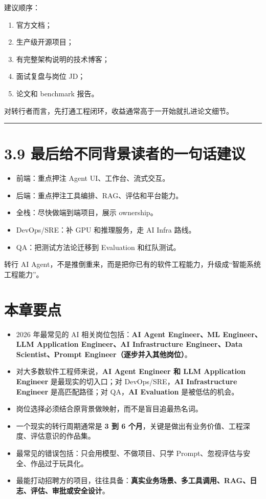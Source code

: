 建议顺序：


\begin{enumerate}[leftmargin=2em]
\item 官方文档；
\item 生产级开源项目；
\item 有完整架构说明的技术博客；
\item 面试复盘与岗位 JD；
\item 论文和 benchmark 报告。
\end{enumerate}

对转行者而言，先打通工程闭环，收益通常高于一开始就扎进论文细节。


\bigskip\hrule\bigskip

\section{3.9 最后给不同背景读者的一句话建议}

\begin{itemize}[leftmargin=2em]
\item 前端：重点押注 Agent UI、工作台、流式交互。
\item 后端：重点押注工具编排、RAG、评估和平台能力。
\item 全栈：尽快做端到端项目，展示 ownership。
\item DevOps/SRE：补 GPU 和推理服务，走 AI Infra 路线。
\item QA：把测试方法论迁移到 Evaluation 和红队测试。
\end{itemize}

转行 AI Agent，不是推倒重来，而是把你已有的软件工程能力，升级成``智能系统工程能力''。


\section{本章要点}

\begin{itemize}[leftmargin=2em]
\item 2026 年最常见的 AI 相关岗位包括：\textbf{AI Agent Engineer、ML Engineer、LLM Application Engineer、AI Infrastructure Engineer、Data Scientist、Prompt Engineer（逐步并入其他岗位）}。
\item 对大多数软件工程师来说，\textbf{AI Agent Engineer 和 LLM Application Engineer} 是最现实的切入口；对 DevOps/SRE，\textbf{AI Infrastructure Engineer} 是高匹配路径；对 QA，\textbf{AI Evaluation} 是被低估的机会。
\item 岗位选择必须结合原背景做映射，而不是盲目追最热名词。
\item 一个现实的转行周期通常是 \textbf{3 到 6 个月}，关键是做出有业务价值、工程深度、评估意识的作品集。
\item 最常见的错误包括：只会用模型、不做项目、只学 Prompt、忽视评估与安全、作品过于玩具化。
\item 最能打动招聘方的项目，往往具备：\textbf{真实业务场景、多工具调用、RAG、日志、评估、审批或安全设计}。
\end{itemize}

